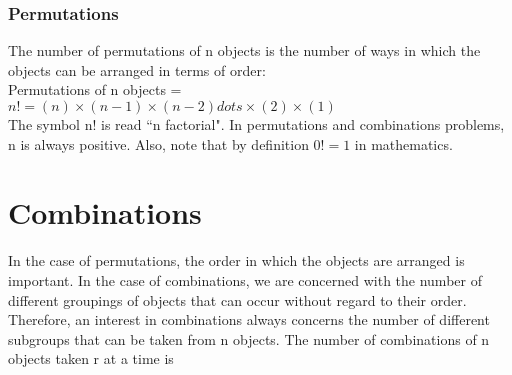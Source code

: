 \documentclass{beamer}
\begin{document}
\begin{frame}
\frametitle{Permutations}
The number of permutations of n objects is the number of ways in which the objects can be arranged in
terms of order: \\
Permutations of n objects = $ n! = (n) \times (n - 1) \times (n-2) dots  \times (2) \times (1)$
\\

The symbol n! is read ``n factorial". In permutations and combinations problems, n is always positive.
Also, note that by definition $0! = 1$ in mathematics.
\end{frame}

\section{Combinations}
\begin{frame}
In the case of permutations, the order in which the objects are arranged is important. In the case of
combinations, we are concerned with the number of different groupings of objects that can occur without regard
to their order. Therefore, an interest in combinations always concerns the number of different subgroups that
can be taken from n objects. The number of combinations of n objects taken r at a time is

\end{frame}
\end{document}

